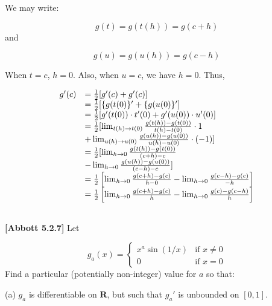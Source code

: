 \documentclass[10pt]{article}
\begin{document}
We may write:


\begin{equation*}
g( t) =g( t( h)) =g( c+h)
\end{equation*}
and


\begin{equation*}
g( u) =g( u( h)) =g( c-h)
\end{equation*}




When $\displaystyle t=c$, $\displaystyle h=0$. Also, when $\displaystyle u=c$, we have $\displaystyle h=0$. Thus,


\begin{equation*}
\begin{array}{ c l }
g'( c) & =\frac{1}{2}[ g'( c) +g'( c)]\\
 & =\frac{1}{2}[\{g( t( 0)\} '+\{g( u( 0)\} ']\\
 & =\frac{1}{2}[ g'( t( 0)) \cdot t'( 0) +g'( u( 0)) \cdot u'( 0)]\\
 & =\frac{1}{2}[\lim _{t( h)\rightarrow t( 0)}\frac{g( t( h)) -g( t( 0))}{t( h) -t( 0)} \cdot 1\\
 & +\lim _{u( h)\rightarrow u( 0)}\frac{g( u( h)) -g( u( 0))}{u( h) -u( 0)} \cdot ( -1)]\\
 & =\frac{1}{2}[\lim _{h\rightarrow 0}\frac{g( t( h)) -g( t( 0))}{( c+h) -c}\\
 & -\lim _{h\rightarrow 0}\frac{g( u( h)) -g( u( 0))}{( c-h) -c}]\\
 & =\frac{1}{2}\left[\lim _{h\rightarrow 0}\frac{g( c+h) -g( c)}{h-0} -\lim _{h\rightarrow 0}\frac{g( c-h) -g( c)}{-h}\right]\\
 & =\frac{1}{2}\left[\lim _{h\rightarrow 0}\frac{g( c+h) -g( c)}{h} -\lim _{h\rightarrow 0}\frac{g( c) -g( c-h)}{h}\right]\\
 & 
\end{array}
\end{equation*}


\textbf{[Abbott 5.2.7]} Let 


\begin{equation*}
g_{a}( x) =\begin{cases}
x^{a}\sin( 1/x) & \text{if } x\neq 0\\
0 & \text{if } x=0
\end{cases}
\end{equation*}
Find a particular (potentially non-integer) value for $\displaystyle a$ so that:



(a) $\displaystyle g_{a}$ is differentiable on $\displaystyle \mathbf{R}$, but such that $\displaystyle g_{a} '$ is unbounded on $\displaystyle [ 0,1]$.
\end{document}
